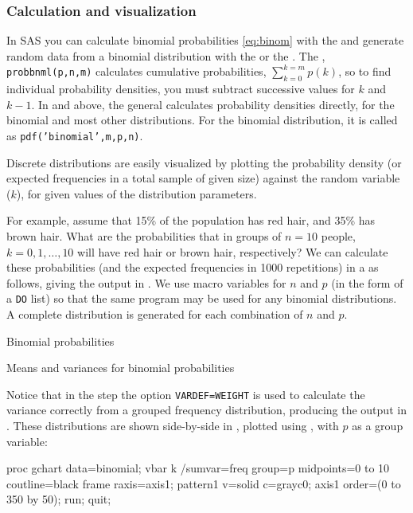 \subsubsection{Calculation and visualization}
In SAS you can calculate binomial probabilities \eqref{eq:binom} with the
 and generate random data from a binomial
distribution with the  or the .
The ,
\texttt{probbnml(p,n,m)} calculates cumulative probabilities,
$ \sum_{k=0}^{k=m} p ( k )$,
so to find individual probability densities, you must subtract
successive values for $k$ and $k-1$.
In  and above, the general 
calculates probability densities directly, for the binomial
and most other distributions.  For the binomial distribution,
it is called as \texttt{pdf('binomial',m,p,n)}.

Discrete distributions are easily visualized by plotting the probability
density (or expected frequencies in a total sample of given size)
against the random variable ($k$), for given values of the distribution
parameters.

For example, assume that 15\% of the population has red
hair, and 35\% has brown hair.
What are the probabilities that in groups of $n=10$
people, $k = 0, 1, \dots, 10$ will have red hair or brown
hair, respectively?
We can calculate these probabilities
(and the expected frequencies in 1000 repetitions) in a \Dstp{} as
follows, giving the output in .
We use macro variables for $n$ and $p$ (in the form of a \texttt{DO} list)
so that the same program may be
used for any binomial distributions.
A complete distribution is generated for each combination of $n$ and $p$.



\begin{Output}
\caption{Binomial probabilities}\label{out:binomial1}

\end{Output}

\begin{Output}
\caption{Means and variances for binomial probabilities}\label{out:binomial2}

\end{Output}

Notice that in the  step the option \texttt{VARDEF=WEIGHT}
is used to calculate the variance correctly from a grouped frequency distribution,
producing the output in .
These distributions are shown side-by-side in ,
plotted using , with $p$ as a group variable:
\begin{listing}
proc gchart data=binomial;
   vbar k /sumvar=freq group=p midpoints=0 to 10
      coutline=black frame raxis=axis1;
   pattern1 v=solid c=grayc0;
   axis1 order=(0 to 350 by 50);
run; quit;
\end{listing}

